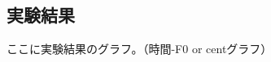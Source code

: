 \documentclass[10ptj,a4j,dvipdfmx,uplatex, oneside, openany]{jsbook}%
\begin{document}
\subsection{実験結果}
ここに実験結果のグラフ。（時間-F0 or centグラフ）

\end{document}
